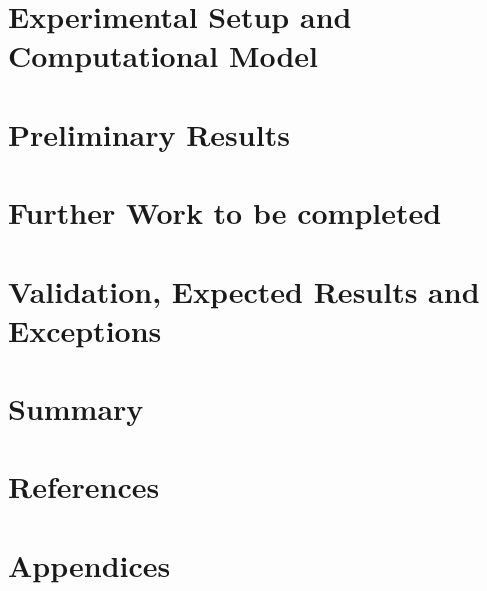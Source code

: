 \documentclass{article}
\begin{document}
\section{Experimental Setup and Computational Model}
\section{Preliminary Results}	
	
\section{Further Work to be completed}
\section{Validation, Expected Results and Exceptions}	
	
\section{Summary}

\section{References}	
	
\section{Appendices}


\end{document}

